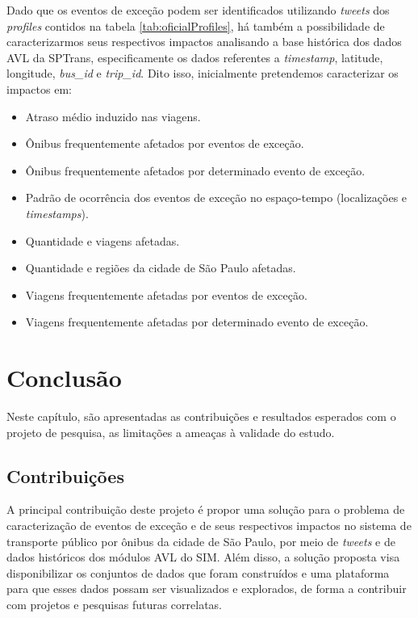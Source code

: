 \documentclass[
	12pt,				%
	oneside,			%
	a4paper,			%
	english,			%
	brazil				%
	]{abntex2ppgsi}
\begin{document}
Dado que os eventos de exceção podem ser identificados utilizando \textit{tweets} dos \textit{profiles} contidos na tabela \ref{tab:oficialProfiles}, há também a possibilidade de caracterizarmos seus respectivos impactos analisando a base histórica dos dados AVL da SPTrans, especificamente os dados referentes a \textit{timestamp}, latitude, longitude, \textit{bus\_id} e \textit{trip\_id}. Dito isso, inicialmente pretendemos caracterizar os impactos em:

\begin{itemize}
\item Atraso médio induzido nas viagens.
\item Ônibus frequentemente afetados por eventos de exceção.
\item Ônibus frequentemente afetados por determinado evento de exceção.
\item Padrão de ocorrência dos eventos de exceção no espaço-tempo (localizações e \textit{timestamps}).
\item Quantidade e viagens afetadas.
\item Quantidade e regiões da cidade de São Paulo afetadas.
\item Viagens frequentemente afetadas por eventos de exceção.
\item Viagens frequentemente afetadas por determinado evento de exceção.
\end{itemize}

\chapter{Conclusão}
\label{conclusion}

Neste capítulo, são apresentadas as contribuições e resultados esperados com o projeto de pesquisa, as limitações a ameaças à validade do estudo. 

\section{Contribuições}

A principal contribuição deste projeto é propor uma solução para o problema de caracterização de eventos de exceção e de seus respectivos impactos no sistema de transporte público por ônibus da cidade de São Paulo, por meio de \textit{tweets} e de dados históricos dos módulos AVL do SIM. Além disso, a solução proposta visa disponibilizar os conjuntos de dados que foram construídos e uma plataforma para que esses dados possam ser visualizados e explorados, de forma a contribuir com projetos e pesquisas futuras correlatas.
\end{document}
